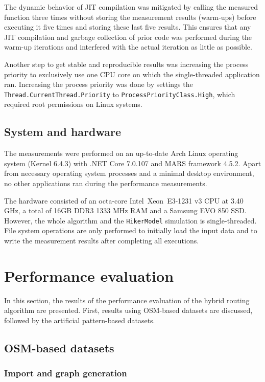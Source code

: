 		The dynamic behavior of JIT compilation was mitigated by calling the measured function three times without storing the measurement results (warm-ups) before executing it five times and storing these last five results.
		This ensures that any JIT compilation and garbage collection of prior code was performed during the warm-up iterations and interfered with the actual iteration as little as possible.
		
		Another step to get stable and reproducible results was increasing the process priority to exclusively use one CPU core on which the single-threaded application ran.
		Increasing the process priority was done by settings the \texttt{Thread.CurrentThread.Priority} to \texttt{ProcessPriorityClass.High}, which required root permissions on Linux systems.
	
	\subsection{System and hardware}
	
		The measurements were performed on an up-to-date Arch Linux operating system (Kernel 6.4.3) with .NET Core 7.0.107 and MARS framework 4.5.2.
		Apart from necessary operating system processes and a minimal desktop environment, no other applications ran during the performance measurements.
		
		The hardware consisted of an octa-core Intel\textregistered\ Xeon\textregistered\ E3-1231 v3 CPU at 3.40 GHz, a total of 16GB DDR3 1333 MHz RAM and a Samsung EVO 850 SSD.
		However, the whole algorithm and the \texttt{HikerModel} simulation is single-threaded.
		File system operations are only performed to initially load the input data and to write the measurement results after completing all executions.
	
\section{Performance evaluation}

	In this section, the results of the performance evaluation of the hybrid routing algorithm are presented.
	First, results using OSM-based datasets are discussed, followed by the artificial pattern-based datasets.

	\subsection{OSM-based datasets}
		
		\subsubsection{Import and graph generation}
		
